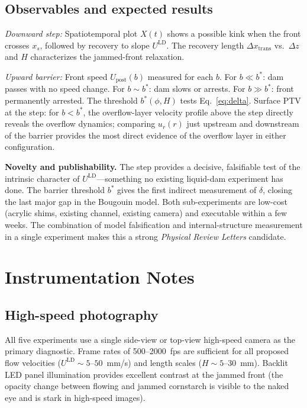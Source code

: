 \documentclass[aps,preprint,superscriptaddress,longbibliography]{revtex4-2}
\newcommand{\ULD}{{U^{\mathrm{LD}}}}
\begin{document}
\subsection{Observables and expected results}

\emph{Downward step:} Spatiotemporal plot $X(t)$ shows a possible kink when
the front crosses $x_s$, followed by recovery to slope $\ULD$.  The recovery
length $\Delta x_\text{trans}$ vs.\ $\Delta z$ and $H$ characterizes the
jammed-front relaxation.

\emph{Upward barrier:} Front speed $U_\text{post}(b)$ measured for each $b$.
For $b \ll b^*$: dam passes with no speed change.  For $b \sim b^*$: dam
slows or arrests.  For $b \gg b^*$: front permanently arrested.  The threshold
$b^*(\phi, H)$ tests Eq.~\eqref{eq:delta}.  Surface PTV at the step: for
$b < b^*$, the overflow-layer velocity profile above the step directly reveals
the overflow dynamics; comparing $u_r(r)$ just upstream and downstream of the
barrier provides the most direct evidence of the overflow layer in either configuration.

\begin{mdframed}[style=noveltybox]
\textbf{Novelty and publishability.}
The step provides a decisive, falsifiable test of the intrinsic character of
$\ULD$---something no existing liquid-dam experiment has done.  The barrier
threshold $b^*$ gives the first indirect measurement of $\delta$, closing the
last major gap in the Bougouin model.  Both sub-experiments are low-cost
(acrylic shims, existing channel, existing camera) and executable within a few
weeks.  The combination of model falsification and internal-structure measurement
in a single experiment makes this a strong \textit{Physical Review Letters}
candidate.
\end{mdframed}

\section{Instrumentation Notes}
\label{sec:measurement}

\subsection{High-speed photography}

All five experiments use a single side-view or top-view high-speed camera as
the primary diagnostic.  Frame rates of 500--2000~fps are sufficient for all
proposed flow velocities ($\ULD \sim 5$--$50$~mm/s) and length scales
($H \sim 5$--$30$~mm).  Backlit LED panel illumination provides excellent
contrast at the jammed front (the opacity change between flowing and jammed
cornstarch is visible to the naked eye and is stark in high-speed images).
\end{document}
